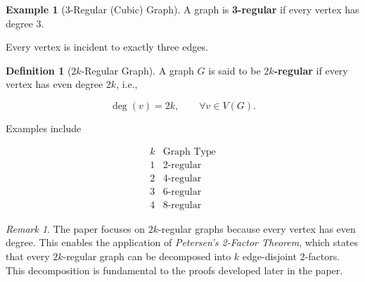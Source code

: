 \documentclass[11pt]{article}
\theoremstyle{plain}
\theoremstyle{definition}
\newtheorem{definition}[theorem]{Definition}
\newtheorem{example}[theorem]{Example}
\theoremstyle{remark}
\newtheorem{remark}[theorem]{Remark}
\begin{document}
\bigskip

\begin{example}[3-Regular (Cubic) Graph]
  A graph is \textbf{3-regular} if every vertex has degree $3$.

  \begin{center}
  \end{center}

  Every vertex is incident to exactly three edges.
\end{example}

\bigskip

\begin{definition}[$2k$-Regular Graph]
  A graph $G$ is said to be \textbf{$2k$-regular} if every vertex has even degree
  $2k$, i.e.,

  \[
    \deg(v)=2k,\qquad \forall v\in V(G).
  \]

  Examples include

  \[
    \begin{array}{c|c}
      k & \text{Graph Type} \\
      \hline
      1 & 2\text{-regular}  \\
      2 & 4\text{-regular}  \\
      3 & 6\text{-regular}  \\
      4 & 8\text{-regular}
    \end{array}
  \]
\end{definition}

\begin{remark}
  The paper focuses on $2k$-regular graphs because every vertex has even degree. This enables the application of \emph{Petersen's 2-Factor Theorem}, which states that every $2k$-regular graph can be decomposed into $k$ edge-disjoint $2$-factors. This decomposition is fundamental to the proofs developed later in the paper.
\end{remark}
\end{document}
